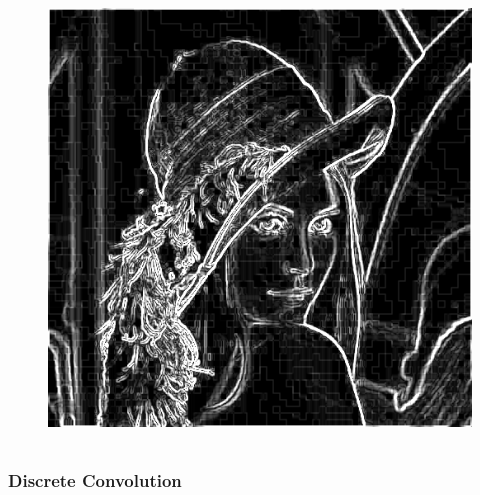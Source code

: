 \documentclass[aspectratio=1610]{beamer}
\newcommand\imageright[1]{ %
    \caption*{\scalebox{.5}{\textcolor{lightgray}{\textcopyright~#1}}} %
}
\begin{document}
\begin{frame}
\begin{columns}
\begin{column}{0.38\textwidth}
\begin{figure}
            \includegraphics[height=0.38\textheight]{sobel.png}
        \end{figure}
    \end{column}
\end{columns}
\end{frame}

\begin{frame}
    \frametitle{Discrete Convolution}
    \begin{figure}
        \centering
        \imageright{Machine Learning Guru}
    \end{figure}
\end{frame}
\end{document}
